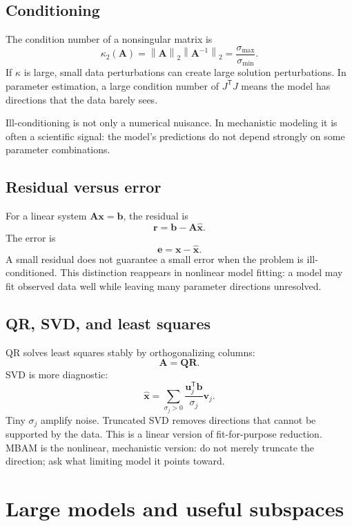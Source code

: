 \documentclass[a4paper]{article}
\newcommand{\mat}[1]{\mathbf{#1}}
\newcommand{\vect}[1]{\mathbf{#1}}
\newcommand{\norm}[1]{\left\lVert #1\right\rVert}
\newcommand{\transpose}{\mathsf{T}}
\newcommand{\jac}{J}
\begin{document}
\subsection{Conditioning}

The condition number of a nonsingular matrix is
\[
  \kappa_2(\mat{A})
  =
  \norm{\mat{A}}_2\norm{\mat{A}^{-1}}_2
  =
  \frac{\sigma_{\max}}{\sigma_{\min}}.
\]
If \(\kappa\) is large, small data perturbations can create large solution perturbations.  In parameter estimation, a large condition number of \(\jac^{\transpose}\jac\) means the model has directions that the data barely sees.

\begin{warning}
  Ill-conditioning is not only a numerical nuisance.  In mechanistic modeling it is often a scientific signal: the model's predictions do not depend strongly on some parameter combinations.
\end{warning}

\subsection{Residual versus error}

For a linear system \(\mat{A}\vect{x}=\vect{b}\), the residual is
\[
  \vect{r}=\vect{b}-\mat{A}\widehat{\vect{x}}.
\]
The error is
\[
  \vect{e}=\vect{x}-\widehat{\vect{x}}.
\]
A small residual does not guarantee a small error when the problem is ill-conditioned.  This distinction reappears in nonlinear model fitting: a model may fit observed data well while leaving many parameter directions unresolved.

\subsection{QR, SVD, and least squares}

QR solves least squares stably by orthogonalizing columns:
\[
  \mat{A}=\mat{Q}\mat{R}.
\]
SVD is more diagnostic:
\[
  \widehat{\vect{x}}
  =
  \sum_{\sigma_j>0}
  \frac{\vect{u}_j^{\transpose}\vect{b}}{\sigma_j}\vect{v}_j.
\]
Tiny \(\sigma_j\) amplify noise.  Truncated SVD removes directions that cannot be supported by the data.  This is a linear version of fit-for-purpose reduction.  MBAM is the nonlinear, mechanistic version: do not merely truncate the direction; ask what limiting model it points toward.

\section{Large models and useful subspaces}
\end{document}
